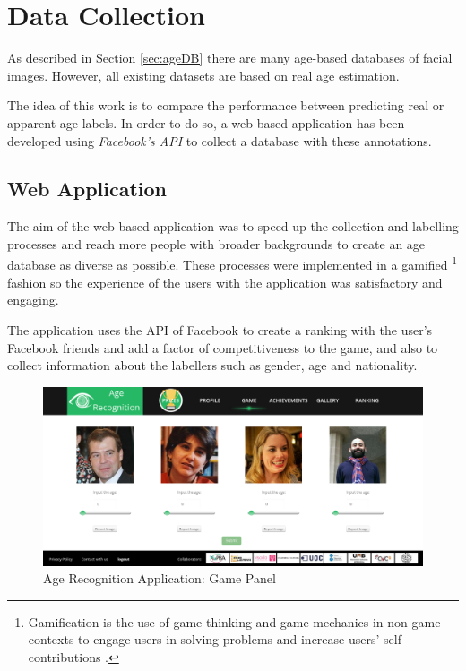 \chapter{Data Collection} \label{chap:data}

As described in Section \ref{sec:ageDB} there are many age-based databases of facial images. However, all existing datasets are based on real age estimation. 

The idea of this work is to compare the performance between predicting real or apparent age labels. In order to do so, a web-based application has been developed using \textit{Facebook's API} to collect a database with these annotations.

\section{Web Application}

The aim of the web-based application was to speed up the collection and labelling processes and reach more people with broader backgrounds to create an age database as diverse as possible. These processes were implemented in a gamified \footnote{Gamification is the use of game thinking and game mechanics in non-game contexts to engage users in solving problems and increase users' self contributions \cite{Deterding:2011:GDE:2181037.2181040}.} fashion so the experience of the users with the application was satisfactory and engaging. 

The application uses the API of Facebook to create a ranking with the user's Facebook friends and add a factor of competitiveness to the game, and also to collect information about the labellers such as gender, age and nationality.

\begin{figure}[!h]
	\centering
	\includegraphics[width=\textwidth]{figures/age_app_1}
	\caption{Age Recognition Application: Game Panel}
	\label{fig:game}
\end{figure}

